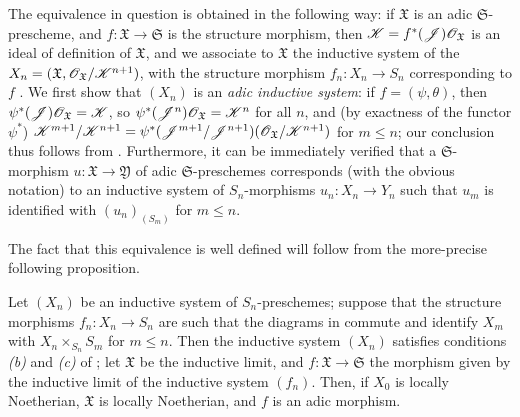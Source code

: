 The equivalence in question is obtained in the following way:
if $\mathfrak{X}$ is an adic $\mathfrak{S}$-prescheme, and $f:\mathfrak{X}\to\mathfrak{S}$ is the structure morphism, then $\mathscr{K}=f^*(\mathscr{J})\mathscr{O}_\mathfrak{X}$ is an ideal of definition of $\mathfrak{X}$, and we associate to $\mathfrak{X}$ the inductive system of the $X_n=(\mathfrak{X},\mathscr{O}_\mathfrak{X}/\mathscr{K}^{n+1})$, with the structure morphism $f_n:X_n\to S_n$ corresponding to $f$ .
We first show that $(X_n)$ is an \emph{adic inductive system}:
if $f=(\psi,\theta)$, then $\psi^*(\mathscr{J})\mathscr{O}_\mathfrak{X}=\mathscr{K}$, so $\psi^*(\mathscr{J}^n)\mathscr{O}_\mathfrak{X}=\mathscr{K}^n$ for all $n$, and (by exactness of the functor $\psi^*$) $\mathscr{K}^{m+1}/\mathscr{K}^{n+1}=\psi^*(\mathscr{J}^{m+1}/\mathscr{J}^{n+1})(\mathscr{O}_\mathfrak{X}/\mathscr{K}^{n+1})$ for $m\leq n$;
our conclusion thus follows from .
Furthermore, it can be immediately verified that a $\mathfrak{S}$-morphism $u:\mathfrak{X}\to\mathfrak{Y}$ of adic $\mathfrak{S}$-preschemes corresponds (with the obvious notation)
to an inductive system of $S_n$-morphisms $u_n:X_n\to Y_n$ such that $u_m$ is identified with $(u_n)_{(S_m)}$ for $m\leq n$.

The fact that this equivalence is well defined will follow from the more-precise following proposition.

\begin{proposition}[10.12.3.1]
\label{I.10.12.3.1}
Let $(X_n)$ be an inductive system of $S_n$-preschemes;
suppose that the structure morphisms $f_n:X_n\to S_n$ are such that the diagrams in  commute and identify $X_m$ with $X_n\times_{S_n}S_m$ for $m\leq n$.
Then the inductive system $(X_n)$ satisfies conditions \emph{(b)} and \emph{(c)} of ;
let $\mathfrak{X}$ be the inductive limit, and $f:\mathfrak{X}\to\mathfrak{S}$ the morphism given by the inductive limit of the inductive system $(f_n)$.
Then, if $X_0$ is locally Noetherian, $\mathfrak{X}$ is locally Noetherian, and $f$ is an adic morphism.
\end{proposition}

